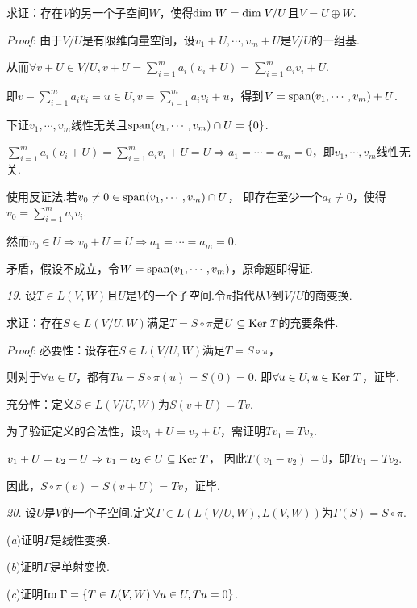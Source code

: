 求证：存在$V$的另一个子空间$W$，使得$\mathrm{dim \;} W=\mathrm{dim \;} V/U$且$V=U \oplus W$.

\textit{Proof}:
由于$V/U$是有限维向量空间，设$v_1+U,\cdots,v_m+U$是$V/U$的一组基.

从而$\forall v+U \in V/U,v+U=\sum_{i=1}^m a_i(v_i+U)=\sum_{i=1}^m a_iv_i+U$.

即$v-\sum_{i=1}^m a_iv_i=u \in U,v=\sum_{i=1}^m a_iv_i+u$，得到$V=\mathrm{span} (v_1,\cdots,v_m)+U$.

下证$v_1,\cdots,v_m$线性无关且$\mathrm{span} (v_1,\cdots,v_m) \cap U =\{0\}$.

$\sum_{i=1}^m a_i(v_i+U)=\sum_{i=1}^m a_iv_i+U=U \Rightarrow a_1=\cdots=a_m=0$，即$v_1,\cdots,v_m$线性无关.

使用反证法.若$v_0 \ne 0 \in \mathrm{span} (v_1,\cdots,v_m) \cap U$，
即存在至少一个$a_i \ne 0$，使得$v_0=\sum_{i=1}^m a_iv_i$.

然而$v_0 \in U \Rightarrow v_0+U=U \Rightarrow a_1=\cdots=a_m=0$.

矛盾，假设不成立，令$W=\mathrm{span} (v_1,\cdots,v_m)$，原命题即得证.

\hspace*{\fill}

\textit{19.}
设$T \in L(V,W)$且$U$是$V$的一个子空间.令$\pi$指代从$V$到$V/U$的商变换.

求证：存在$S \in L(V/U,W)$满足$T=S \circ \pi$是$U \subseteq \mathrm{Ker \;} T$的充要条件.

\textit{Proof}:
必要性：设存在$S \in L(V/U,W)$满足$T=S \circ \pi$，

则对于$\forall u \in U$，都有$Tu=S \circ \pi(u)=S(0)=0$.
即$\forall u \in U,u \in \mathrm{Ker \;} T$，证毕.

充分性：定义$S \in L(V/U,W)$为$S(v+U)=Tv$.

为了验证定义的合法性，设$v_1+U=v_2+U$，需证明$Tv_1=Tv_2$.

$v_1+U=v_2+U \Rightarrow v_1-v_2 \in U \subseteq \mathrm{Ker \;} T$，
因此$T(v_1-v_2)=0$，即$Tv_1=Tv_2$.

因此，$S \circ \pi(v)=S(v+U)=Tv$，证毕.

\hspace*{\fill}

\textit{20.}
设$U$是$V$的一个子空间.定义$\Gamma \in L(L(V/U,W),L(V,W))$为$\Gamma(S)=S \circ \pi$.

(\textit{a})证明$\Gamma$是线性变换.

(\textit{b})证明$\Gamma$是单射变换.

(\textit{c})证明$\mathrm{Im \;}  \Gamma=\{T \in L(V,W)|\forall u \in U,Tu=0 \}$.

